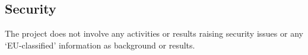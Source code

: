 
\subsection{Security}

The \Project{} project does not involve any activities or results raising security issues or any `EU-classified' information as background or results.


